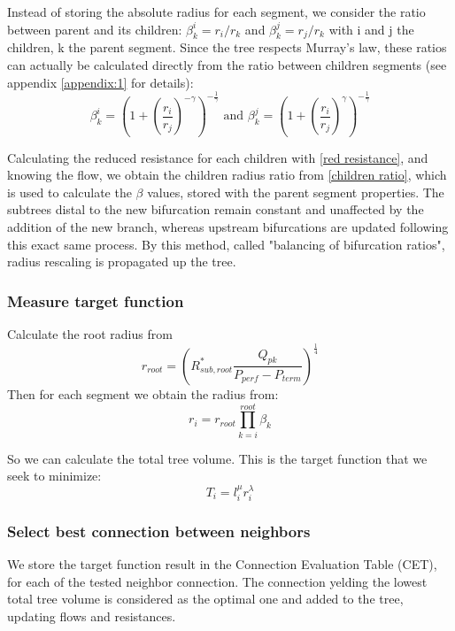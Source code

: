 \documentclass[a4paper, 11pt]{article} %
\begin{document}
Instead of storing the absolute radius for each segment, we consider the ratio between parent and its children: $\beta^i_k = r_i / r_k$ and $\beta^j_k = r_j / r_k$ with i and j the children, k the parent segment. Since the tree respects Murray's law, these ratios can actually be calculated directly from the ratio between children segments (see appendix \ref{appendix:1} for details):
\begin{equation}
\beta^i_k = \left( 1 + (\frac{r_i}{r_j})^{-\gamma}\right)^{-\frac{1}{\gamma}} \text{ and }
\beta^j_k = \left( 1 + (\frac{r_i}{r_j})^{\gamma}\right)^{-\frac{1}{\gamma}}
\end{equation}


Calculating the reduced resistance for each children with \eqref{red resistance}, and knowing the flow, we obtain the children radius ratio from \eqref{children ratio}, which is used to calculate the $\beta$ values, stored with the parent segment properties. 
The subtrees distal to the new bifurcation remain constant and unaffected by the addition of the new branch, whereas upstream bifurcations are updated following this exact same process. By this method, called "balancing of bifurcation ratios", radius rescaling is propagated up the tree.
 


\subsubsection{Measure target function}
\label{target}
Calculate the root radius from
\begin{equation}
r_{root} = \left( R_{sub, root}^* \frac{Q_{pk}}{P_{perf}-P_{term}}\right)^\frac{1}{4}
\end{equation}
Then for each segment we obtain the radius from:
\begin{equation}
r_i = r_{root} \prod\limits_{k=i}^{root} \beta_k
\end{equation}

So we can calculate the total tree volume. This is the target function that we seek to minimize:
\begin{equation}
T_i = l_i^{\mu} r_i^{\lambda}
\end{equation}

 

\subsubsection{Select best connection between neighbors}
We store the target function result in the Connection Evaluation Table (CET), for each of the tested neighbor connection. The connection yelding the lowest total tree volume is considered as the optimal one and added to the tree, updating flows and resistances.
\end{document}
